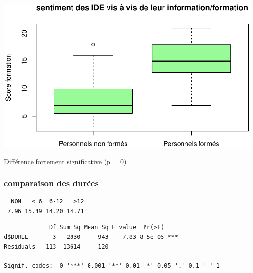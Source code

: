 \documentclass[]{article}
\newenvironment{Shaded}{\begin{snugshade}}{\end{snugshade}}
\newcommand{\KeywordTok}[1]{\textcolor[rgb]{0.13,0.29,0.53}{\textbf{{#1}}}}
\newcommand{\DataTypeTok}[1]{\textcolor[rgb]{0.13,0.29,0.53}{{#1}}}
\newcommand{\StringTok}[1]{\textcolor[rgb]{0.31,0.60,0.02}{{#1}}}
\newcommand{\NormalTok}[1]{{#1}}
\begin{document}
\begin{Shaded}
\end{Shaded}

\includegraphics{analyse_files/figure-latex/unnamed-chunk-18-1.pdf}

Différence fortement significative (p = 0).

\subsubsection{comparaison des durées}\label{comparaison-des-durees}

\begin{verbatim}
  NON   < 6  6-12   >12 
 7.96 15.49 14.20 14.71 
\end{verbatim}

\begin{verbatim}
             Df Sum Sq Mean Sq F value  Pr(>F)    
d$DUREE       3   2830     943    7.83 8.5e-05 ***
Residuals   113  13614     120                    
---
Signif. codes:  0 '***' 0.001 '**' 0.01 '*' 0.05 '.' 0.1 ' ' 1
\end{verbatim}
\end{document}
